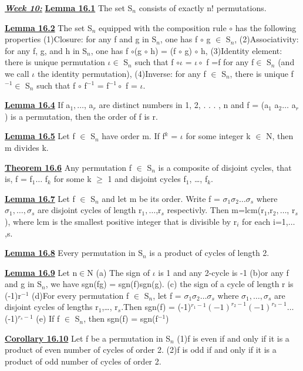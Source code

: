 \documentclass[10pt]{article}
\begin{document}
\par\textbf{\underline{\textit{Week 10:}}}
\textbf{\underline{Lemma 16.1}}
The set S$_n$ consists of exactly n! permutations.
\par\textbf{\underline{Lemma 16.2}}
The set S$_n$ equipped with the composition rule $\circ$ has the following properties
(1)Closure: for any f and g in S$_n$, one has f $\circ$ g $\in$ S$_n$,
(2)Associativity: for any f, g, and h in S$_n$, one has f $\circ$(g $\circ$ h) = (f $\circ$ g) $\circ$ h,
(3)Identity element: there is unique permutation $\iota \in$ S$_n$ such that f $\circ \iota $ = $\iota \circ$ f =f
for any f$\in$ S$_n$ (and we call $\iota$ the identity permutation),
(4)Inverse: for any f $\in$ S$_n$, there is unique f$^{-1} \in$ S$_n$ such that
f $\circ$ f$^{-1}$ = f$^{-1} \circ$ f = $\iota$.
\par\textbf{\underline{Lemma 16.4}}
If a$_1, \dots $, a$_r$ are distinct numbers in {1, 2, . . . , n} and f = (a$_1$ a$_2 \dots $ a$_r$) is a
permutation, then the order of f is r.
\par\textbf{\underline{Lemma 16.5}}
Let f $\in$ S$_n$ have order m. If f$^{k}$ = $\iota$ for some integer k $\in$ N, then m divides k.
\par\textbf{\underline{Theorem 16.6}}
Any permutation f $\in$ S$_n$ is a composite of disjoint cycles, that is, f = f$_1 \dots $ f$_k$
for some k $\geq$ 1 and disjoint cycles f$_1$, \dots , f$_k$.
\par\textbf{\underline{Lemma 16.7}}
Let f $\in$ S$_n$ and let m be its order. Write f = $\sigma_1\sigma_2\dots \sigma_s$ where $\sigma_1,\dots ,\sigma_s$ are disjoint cycles of length 
r$_1, \dots$,r$_s$ respectivly. Then m=lcm(r$_1$,r$_2, \dots$, r$_s$),
where lcm is the smallest positive integer that is divisible by r$_i$ for each i=1,$\dots$,s.
\par\textbf{\underline{Lemma 16.8}}
Every permutation in S$_n$ is a product of cycles of length 2.
\par\textbf{\underline{Lemma 16.9}}
Let n$\in$N
(a) The sign of $\iota$ is 1 and any 2-cycle is -1
(b)or any f and g in S$_n$, we have sgn(fg) = sgn(f)sgn(g).
(c) the sign of a cycle of length r is (-1)r$^{-1}$
(d)For every permutation f $\in$ S$_n$, let f = $\sigma_1\sigma_2 \dots \sigma_s$ where $\sigma_1, \dots , \sigma_s$ are disjoint cycles
of lengths r$_1$,\dots , r$_s$.Then sgn(f) = (-1)$^{r_1-1}(-1)^{r_2-1}(-1)^{r_3-1} \dots $(-1)$^{r_s-1}$
(e) If f $\in$ S$_n$, then sgn(f) = sgn(f$^{-1}$)
\par\textbf{\underline{Corollary 16.10}}
Let f be a permutation in S$_n$
(1)f is even if and only if it is a product of even number of cycles of order 2.
(2)f is odd if and only if it is a product of odd number of cycles of order 2.
\end{document}
